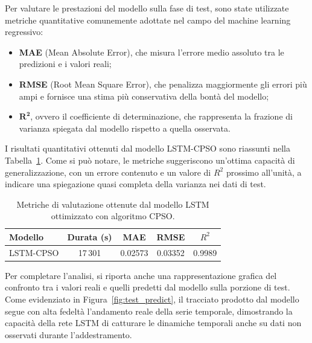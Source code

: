 \documentclass{article}
\begin{document}
Per valutare le prestazioni del modello sulla fase di test, sono state utilizzate metriche quantitative 
comunemente adottate nel campo del machine learning regressivo:

\vspace{0.5em}
\begin{itemize}
    \item \textbf{MAE} (Mean Absolute Error), che misura l’errore medio assoluto tra le predizioni e i valori reali;
    \item \textbf{RMSE} (Root Mean Square Error), che penalizza maggiormente gli errori più ampi e fornisce una stima più conservativa della bontà del modello;
    \item \boldmath$\mathbf{R^2}$\unboldmath{}, ovvero il coefficiente di determinazione, che rappresenta la frazione di varianza spiegata dal modello rispetto a quella osservata.
\end{itemize}
\vspace{0.5em}

I risultati quantitativi ottenuti dal modello LSTM-CPSO sono riassunti nella Tabella~\ref{tab:Result_LSTM_CPSO}. Come si può notare, le metriche suggeriscono un’ottima capacità di generalizzazione, con un errore contenuto e un valore di $R^2$ prossimo all’unità, a indicare una spiegazione quasi completa della varianza nei dati di test.

\begin{table}[H]
    \centering
    \renewcommand{\arraystretch}{1.2}
    \begin{tabular}{lcccc}
        \toprule
        \textbf{Modello} & \textbf{Durata (s)} & \textbf{MAE} & \textbf{RMSE} & \boldmath$R^2$ \\
        \midrule
        LSTM-CPSO & 17\,301 & 0.02573 & 0.03352 & 0.9989 \\
        \bottomrule
    \end{tabular}
    \caption{Metriche di valutazione ottenute dal modello LSTM ottimizzato con algoritmo CPSO.}
    \label{tab:Result_LSTM_CPSO}
\end{table}

Per completare l’analisi, si riporta anche una rappresentazione grafica del confronto tra i valori 
reali e quelli predetti dal modello sulla porzione di test. Come evidenziato in Figura~\ref{fig:test_predict}, 
il tracciato prodotto dal modello segue con alta fedeltà l’andamento reale della serie temporale, 
dimostrando la capacità della rete LSTM di catturare le dinamiche temporali anche su dati non osservati 
durante l’addestramento.
\end{document}
